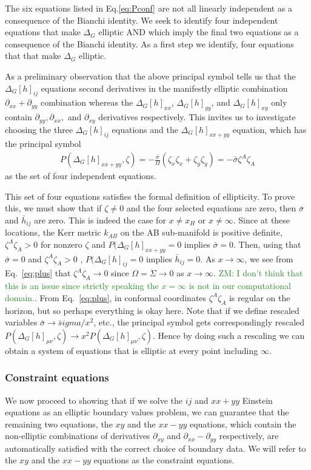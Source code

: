 \documentclass[aps,prd,amsmath,showpacs,amssymb,superscriptaddress,nofootinbib,longbibliography,eqsecnum,preprintnumbers]{revtex4-1}
\newcommand{\zach}[1]{\textcolor{ForestGreen}{#1}}
\begin{document}
The six equations listed in Eq.\eqref{eq:Pconf} are not all linearly independent as a consequence of the Bianchi identity. 
We seek to identify four independent equations that make $\Delta_G$ elliptic AND which imply the final two equations as a consequence of the Bianchi identity. As a first step we identify, four equations that that make $\Delta_G$ elliptic. 

As a preliminary observation that the above principal symbol tells us that the $\Delta_G[h]_{ij}$ equations second derivatives in the manifestly elliptic combination $\partial_{xx}+\partial_{yy}$ combination  whereas the  $\Delta_G[h]_{xx}$,  $\Delta_G[h]_{yy}$, and $\Delta_G[h]_{xy}$ only contain  $\partial_{yy}, \partial_{xx},$ and $\partial_{xy}$ derivatives respectively. This invites us to investigate choosing the three $\Delta_G[h]_{ij}$ equations and the  $\Delta_G[h]_{xx+yy}$ equation, which has the principal symbol
\begin{align}
&P(\Delta_G[h]_{xx+yy},\zeta)=-\frac{\bar\sigma}{\Omega}(\zeta_x\zeta_x+\zeta_y\zeta_y)=-\bar \sigma \zeta^A\zeta_A& \label{eq:plus}
\end{align}
as the set of four independent equations. 

This set of four equations satisfies the formal definition of ellipticity. To prove this, we must show that if $\zeta\neq0$ and the four selected equations are zero, then $\bar \sigma$ and $\bar h_{ij}$ are zero. This is indeed the case for $x \neq x_H$ or $x \neq \infty$. Since at these locations,  the Kerr metric  $k_{AB}$ on the AB sub-manifold is positive definite, $\zeta^A\zeta_A>0$ for nonzero $\zeta$ and $P(\Delta_G[h]_{xx+yy}=0$ implies $\bar \sigma =0$. Then, using that  $\bar \sigma =0$ and  $\zeta^A\zeta_A>0$ , $P(\Delta_G[h]_{ij}=0$ implies $\bar h_{ij}=0$. As $x\to \infty$, we see from Eq.~\eqref{eq:plus} that $\zeta^A\zeta_A \to 0$ since $\Omega =\Sigma \to 0$ as $x\to \infty$. \zach{ZM: I don't think that this is an issue since strictly speaking the $x =\infty$ is not in our computational domain.}. From  Eq.~\eqref{eq:plus}, in conformal coordinates $\zeta^A\zeta_A $ is regular on the horizon, but so perhaps everything is okay here.
Note that if we define rescaled variables $\bar \sigma \to \bar sigma / x^2$, etc., the principal symbol gets correspondingly rescaled $P(\Delta_G[h]_{\mu\nu},\zeta) \to x^2P(\Delta_G[h]_{\mu\nu},\zeta)$. Hence by doing such a rescaling we can obtain a system of equations that is elliptic at every point including $\infty$.

\subsubsection{Constraint equations}
We now proceed to showing that if we solve the $ij$ and $xx+yy$ Einstein equations as an elliptic boundary values problem, we can guarantee that the remaining two equations, the $xy$ and the $xx - yy$ equations, which contain the non-elliptic combinations of derivatives $\partial_{xy}$ and $\partial_{xx}-\partial_{yy}$ respectively, are automatically satisfied with the correct choice of boundary data.  We will refer to the $xy$ and the $xx - yy$ equations as the constraint equations.
\end{document}
